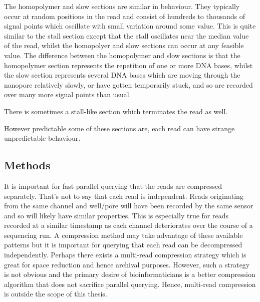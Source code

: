 

The homopolymer and slow sections are similar in behaviour. They typically occur at random positions in the read and consist of hundreds to thousands of signal points which oscillate with small variation around some value. This is quite similar to the stall section except that the stall oscillates near the median value of the read, whilst the homopolyer and slow sections can occur at any feasible value. The difference between the homopolymer and slow sections is that the homopolymer section represents the repetition of one or more DNA bases, whilst the slow section represents several DNA bases which are moving through the nanopore relatively slowly, or have gotten temporarily stuck, and so are recorded over many more signal points than usual.





There is sometimes a stall-like section which terminates the read as well.




However predictable some of these sections are, each read can have strange unpredictable behaviour.


\subsection{Methods}


It is important for fast parallel querying that the reads are compressed separately. That's not to say that each read is independent. Reads originating from the same channel and well/pore will have been recorded by the same sensor and so will likely have similar properties. This is especially true for reads recorded at a similar timestamp as each channel deteriorates over the course of a sequencing run. A compression method may take advantage of these available patterns but it is important for querying that each read can be decompressed independently. Perhaps there exists a multi-read compression strategy which is great for space reduction and hence archival purposes. However, such a strategy is not obvious and the primary desire of bioinformaticians is a better compression algorithm that does not sacrifice parallel querying. Hence, multi-read compression is outside the scope of this thesis.

